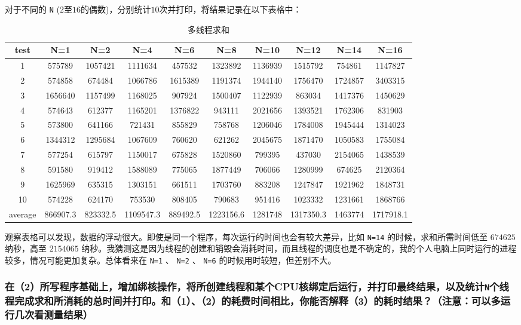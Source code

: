 对于不同的 {\tt N} ($2$至$16$的偶数)，分别统计$10$次并打印，将结果记录在以下表格中：

\begin{table}[H]
    \caption{多线程求和}
    \begin{tabular}{|c|c|c|c|c|c|c|c|c|c|}
    \hline
    test & N=1 & N=2 & N=4 & N=6 & N=8 & N=10 & N=12 & N=14 & N=16 \\ \hline
    1 & 575789 & 1057421 & 1111634 & 457532 & 1323892 & 1136939 & 1515792 & 754861 & 1147827 \\ \hline
    2 & 574858 & 674484 & 1066786 & 1615389 & 1191374 & 1944140 & 1756470 & 1724857 & 3403315 \\ \hline
    3 & 1656640 & 1157499 & 1168025 & 907924 & 1500407 & 1122939 & 863034 & 1417376 & 1450629 \\ \hline
    4 & 574643 & 612377 & 1165201 & 1376822 & 943111 & 2021656 & 1393521 & 1762306 & 831903 \\ \hline
    5 & 573800 & 641166 & 721431 & 855829 & 758768 & 1206046 & 1784008 & 1945444 & 1314023 \\ \hline
    6 & 1344312 & 1295684 & 1067609 & 760620 & 621262 & 2045675 & 1871470 & 1050583 & 1755084 \\ \hline
    7 & 577254 & 615797 & 1150017 & 675828 & 1520860 & 799395 & 437030 & 2154065 & 1438539 \\ \hline
    8 & 591580 & 919412 & 1588089 & 775065 & 1877449 & 706066 & 1280999 & 674625 & 2120364 \\ \hline
    9 & 1625969 & 635315 & 1303151 & 661511 & 1703760 & 883208 & 1247847 & 1921962 & 1848731 \\ \hline
    10 & 574228 & 624170 & 753530 & 808405 & 790683 & 951416 & 1023332 & 1231661 & 1868766 \\ \hline
    average & 866907.3 & 823332.5 & 1109547.3 & 889492.5 & 1223156.6 & 1281748 & 1317350.3 & 1463774 & 1717918.1 \\ \hline
    \end{tabular}
\end{table}

观察表格可以发现，数据的浮动很大。即使是同一个程序，每次运行的时间也会有较大差异，比如 {\tt N=14} 的时候，求和所需时间低至 $674625$ 纳秒，高至 $2154065$ 纳秒。我猜测这是因为线程的创建和销毁会消耗时间，而且线程的调度也是不确定的，我的个人电脑上同时运行的进程较多，情况可能更加复杂。总体看来在 {\tt N=1} 、 {\tt N=2} 、 {\tt N=6} 的时候用时较短，但差别不大。

\subsubsection{
    在（2）所写程序基础上，增加绑核操作，将所创建线程和某个CPU核绑定后运行，并打印最终结果，以及统计{\tt N}个线程完成求和所消耗的总时间并打印。和（1）、（2）的耗费时间相比，你能否解释（3）的耗时结果？（注意：可以多运行几次看测量结果）
}

